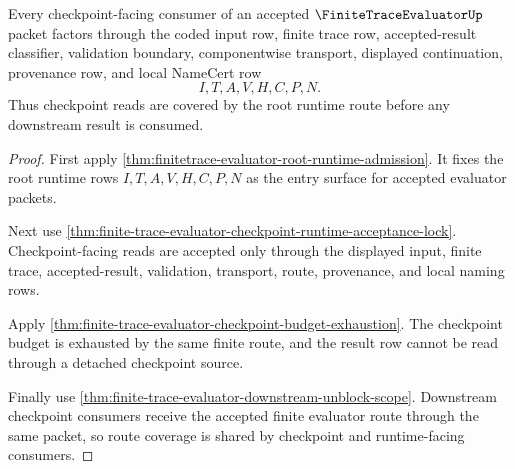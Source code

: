 \begin{theorem}
\label{thm:finitetrace-evaluator-checkpoint-route-coverage}
Every checkpoint-facing consumer of an accepted $\FiniteTraceEvaluatorUp$ packet factors through the coded input row, finite trace row, accepted-result classifier, validation boundary, componentwise transport, displayed continuation, provenance row, and local NameCert row
$$
I,T,A,V,H,C,P,N.
$$
Thus checkpoint reads are covered by the root runtime route before any downstream result is consumed.
\end{theorem}
\begin{proof}
First apply \autoref{thm:finitetrace-evaluator-root-runtime-admission}. It fixes the root runtime rows $I,T,A,V,H,C,P,N$ as the entry surface for accepted evaluator packets.

Next use \autoref{thm:finite-trace-evaluator-checkpoint-runtime-acceptance-lock}. Checkpoint-facing reads are accepted only through the displayed input, finite trace, accepted-result, validation, transport, route, provenance, and local naming rows.

Apply \autoref{thm:finite-trace-evaluator-checkpoint-budget-exhaustion}. The checkpoint budget is exhausted by the same finite route, and the result row cannot be read through a detached checkpoint source.

Finally use \autoref{thm:finite-trace-evaluator-downstream-unblock-scope}. Downstream checkpoint consumers receive the accepted finite evaluator route through the same packet, so route coverage is shared by checkpoint and runtime-facing consumers.
\end{proof}

